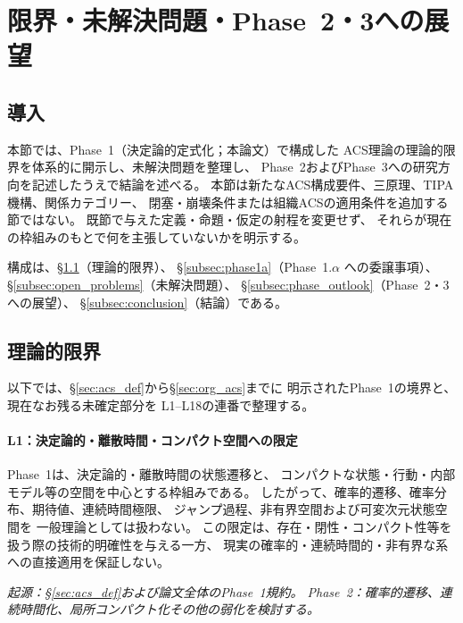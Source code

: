 \section{限界・未解決問題・Phase~2・3への展望}
\label{sec:limitations_and_outlook}

\subsection*{導入}
\label{subsec:s9_intro}

本節では、Phase~1（決定論的定式化；本論文）で構成した
ACS理論の理論的限界を体系的に開示し、未解決問題を整理し、
Phase~2およびPhase~3への研究方向を記述したうえで結論を述べる。
本節は新たなACS構成要件、三原理、TIPA機構、関係カテゴリー、
閉塞・崩壊条件または組織ACSの適用条件を追加する節ではない。
既節で与えた定義・命題・仮定の射程を変更せず、
それらが現在の枠組みのもとで何を主張していないかを明示する。

構成は、\S\ref{subsec:limitations_list}（理論的限界）、
\S\ref{subsec:phase1a}（Phase~1.$\alpha$ への委譲事項）、
\S\ref{subsec:open_problems}（未解決問題）、
\S\ref{subsec:phase_outlook}（Phase~2・3への展望）、
\S\ref{subsec:conclusion}（結論）である。

\subsection{理論的限界}
\label{subsec:limitations_list}

以下では、\S\ref{sec:acs_def}から\S\ref{sec:org_acs}までに
明示されたPhase~1の境界と、現在なお残る未確定部分を
L1--L18の連番で整理する。

\paragraph{L1：決定論的・離散時間・コンパクト空間への限定}
\label{lim:L1}
Phase~1は、決定論的・離散時間の状態遷移と、
コンパクトな状態・行動・内部モデル等の空間を中心とする枠組みである。
したがって、確率的遷移、確率分布、期待値、連続時間極限、
ジャンプ過程、非有界空間および可変次元状態空間を
一般理論としては扱わない。
この限定は、存在・閉性・コンパクト性等を扱う際の技術的明確性を与える一方、
現実の確率的・連続時間的・非有界な系への直接適用を保証しない。

\medskip
\noindent\textit{起源：\S\ref{sec:acs_def}および論文全体のPhase~1規約。
Phase~2：確率的遷移、連続時間化、局所コンパクト化その他の弱化を検討する。}

